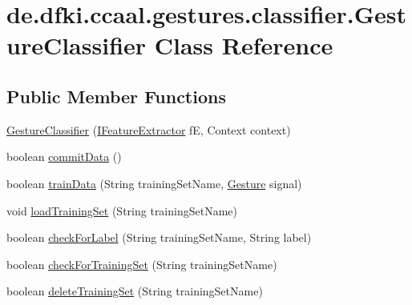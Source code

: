 \hypertarget{classde_1_1dfki_1_1ccaal_1_1gestures_1_1classifier_1_1_gesture_classifier}{\section{de.\-dfki.\-ccaal.\-gestures.\-classifier.\-Gesture\-Classifier Class Reference}
\label{classde_1_1dfki_1_1ccaal_1_1gestures_1_1classifier_1_1_gesture_classifier}
}
\subsection*{Public Member Functions}
\begin{DoxyCompactItemize}
\item 
\hyperlink{classde_1_1dfki_1_1ccaal_1_1gestures_1_1classifier_1_1_gesture_classifier_af327c951d946b665bcdd15d32d43e080}{Gesture\-Classifier} (\hyperlink{interfacede_1_1dfki_1_1ccaal_1_1gestures_1_1classifier_1_1feature_extraction_1_1_i_feature_extractor}{I\-Feature\-Extractor} f\-E, Context context)
\item 
boolean \hyperlink{classde_1_1dfki_1_1ccaal_1_1gestures_1_1classifier_1_1_gesture_classifier_aaa91f7711fdb6e1e8f61d59ec4982f48}{commit\-Data} ()
\item 
boolean \hyperlink{classde_1_1dfki_1_1ccaal_1_1gestures_1_1classifier_1_1_gesture_classifier_a332cbdf1f5c59635561bdb1d3483518c}{train\-Data} (String training\-Set\-Name, \hyperlink{classde_1_1dfki_1_1ccaal_1_1gestures_1_1_gesture}{Gesture} signal)
\item 
void \hyperlink{classde_1_1dfki_1_1ccaal_1_1gestures_1_1classifier_1_1_gesture_classifier_a875704ac920de87239f572e829d1e7f4}{load\-Training\-Set} (String training\-Set\-Name)
\item 
boolean \hyperlink{classde_1_1dfki_1_1ccaal_1_1gestures_1_1classifier_1_1_gesture_classifier_a76332c197e6c3c6cc012c6bae4fc20ee}{check\-For\-Label} (String training\-Set\-Name, String label)
\item 
boolean \hyperlink{classde_1_1dfki_1_1ccaal_1_1gestures_1_1classifier_1_1_gesture_classifier_ac0c4450afdb6352f71514382492ec383}{check\-For\-Training\-Set} (String training\-Set\-Name)
\item 
boolean \hyperlink{classde_1_1dfki_1_1ccaal_1_1gestures_1_1classifier_1_1_gesture_classifier_a831693275e00427ce2ca1b210204ff56}{delete\-Training\-Set} (String training\-Set\-Name)
\item 

\end{DoxyCompactItemize}

